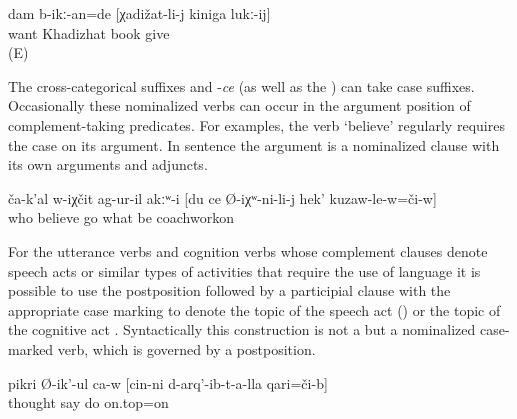%
\begin{exe}
	
			\ex	\label{ex:‎I wanted to give the book to Khadizhat2}
	\gll	dam	b-ikː-an=de	[χadižat-li-j	kiniga	lukː-ij]\\
		 	want	Khadizhat	book	give\\
	\glt	{} (E)
\end{exe}

The cross-categorical suffixes  and -\textit{ce} (as well as the ) can take case suffixes. Occasionally these nominalized verbs can occur in the argument position of complement-taking predicates. For examples, the verb `believe' regularly requires the  case on its  argument. In sentence  the  argument is a nominalized clause with its own arguments and adjuncts.

%
\begin{exe}
	\ex	\label{ex:‎Nobody believed what had happened to me, there up on the coachwork}
	\gll	ča-k'al	w-iχčit	ag-ur-il	akːʷ-i	[du	ce	Ø-iχʷ-ni-li-j	hek'	kuzaw-le-w=či-w]\\
		who	believe	go			what	be		coachworkon\\
	\glt	{}
\end{exe}

For the utterance verbs and cognition verbs whose complement clauses denote speech acts or similar types of activities that require the use of language it is possible to use the postposition  followed by a participial clause with the appropriate case marking to denote the topic of the speech act () or the topic of the cognitive act . Syntactically this construction is not a  but a nominalized case-marked verb, which is governed by a postposition.  
%
\begin{exe}
	\ex	\label{ex:He thinks about what he had done}
	\gll	pikri	Ø-ik'-ul	ca-w	[cin-ni	d-arq'-ib-t-a-lla	qari=či-b]\\
		thought	say			do	on.top=on\\
	\glt	{}
\end{exe}

